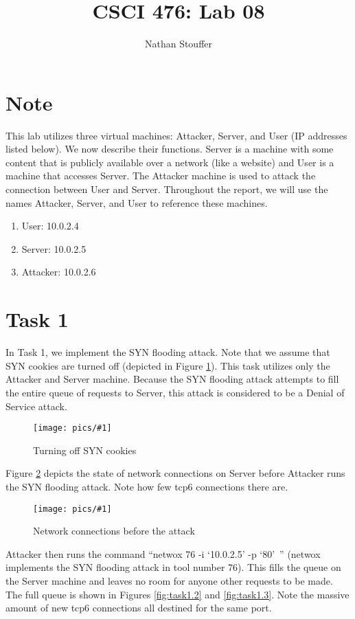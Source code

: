 \documentclass[11pt]{article}
\newcommand{\fig}[2]{ 
\begin{figure}[h]
	\centering
	\caption{#2}
	\texttt{[image: pics/\#1]}
	\label{fig:#1}
\end{figure} 
}
\begin{document}
\title{CSCI 476: Lab 08}
\author{Nathan Stouffer}
\maketitle
\newpage

\section*{Note}

This lab utilizes three virtual machines: Attacker, Server, and User (IP addresses listed below). We now describe their functions. Server is a machine with some content that is publicly available over a network (like a website) and User is a machine that accesses Server. The Attacker machine is used to attack the connection between User and Server. Throughout the report, we will use the names Attacker, Server, and User to reference these machines.

\begin{enumerate}
	\item User: 10.0.2.4
	\item Server: 10.0.2.5
	\item Attacker: 10.0.2.6
\end{enumerate}

\newpage
\section*{Task 1}

In Task 1, we implement the SYN flooding attack. Note that we assume that SYN cookies are turned off (depicted in Figure \ref{fig:task1.0}). This task utilizes only the Attacker and Server machine. Because the SYN flooding attack attempts to fill the entire queue of requests to Server, this attack is considered to be a Denial of Service attack.

\fig{task1.0}{Turning off SYN cookies}

Figure \ref{fig:task1.1} depicts the state of network connections on Server before Attacker runs the SYN flooding attack. Note how few tcp6 connections there are.

\fig{task1.1}{Network connections before the attack}

\newpage
Attacker then runs the command ``netwox 76 -i `10.0.2.5' -p `80'\ '' (netwox implements the SYN flooding attack in tool number 76). This fills the queue on the Server machine and leaves no room for anyone other requests to be made. The full queue is shown in Figures \ref{fig:task1.2} and \ref{fig:task1.3}. Note the massive amount of new tcp6 connections all destined for the same port.
\end{document}
